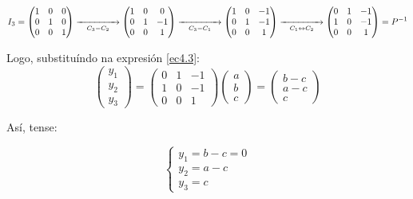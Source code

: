 \documentclass[twoside]{report}
\theoremstyle{mystyle}
\begin{document}
$$
I_{3} = 
\begin{pmatrix}
1 & 0 & 0\\
0 & 1 & 0\\
0 & 0 & 1
\end{pmatrix}
\underset{C_{3} - C_{2}}{\xrightarrow{\hspace{15mm}}}
\begin{pmatrix}
1 & 0 & 0 \\
0 & 1 & -1 \\
0 & 0 & 1
\end{pmatrix}
\underset{C_{3} - C_{1}}{\xrightarrow{\hspace{15mm}}}
\begin{pmatrix}
1 & 0 & -1\\
0 & 1 & -1\\
0 & 0 & 1
\end{pmatrix}
\underset{C_{1} \leftrightarrow C_{2}}{\xrightarrow{\hspace{15mm}}}
\begin{pmatrix}
0 & 1 & -1\\
1 & 0 & -1\\
0 & 0 & 1
\end{pmatrix}
= P^{-1}
$$

\vspace{3mm}

\noindent Logo, substituíndo na expresión \eqref{ec4.3}:\\

$$
\begin{pmatrix}
y_{1} \\ y_{2} \\ y_{3}
\end{pmatrix}
=
\begin{pmatrix}
0 & 1 & -1\\
1 & 0 & -1\\
0 & 0 & 1
\end{pmatrix}
\begin{pmatrix}
a \\ b \\ c
\end{pmatrix}
=
\begin{pmatrix}
b - c \\ a -c \\ c
\end{pmatrix}
$$

\vspace{3mm}

\noindent Así, tense:

$$
\begin{cases}
y_{1} = b - c = 0\\
y_{2} = a - c\\
y_{3} = c
\end{cases}
$$
\end{document}
